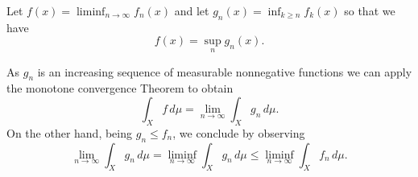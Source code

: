 \documentclass[12pt]{article}
\begin{document}
Let $f(x)=\liminf_{n\to\infty} f_n(x)$ and let $g_n(x)=\inf_{k\ge n} f_k(x)$
so that we have
\[
  f(x) = \sup_n g_n(x).
\]

As $g_n$ is an increasing sequence of measurable nonnegative functions we can apply the monotone convergence Theorem to obtain
\[
  \int_X f\, d\mu = \lim_{n\to\infty} \int_X g_n\, d\mu.
\]
On the other hand, being $g_n\le f_n$, we conclude by observing
\[
  \lim_{n\to\infty} \int_X g_n\, d\mu 
= \liminf_{n\to\infty}\int_X g_n\, d\mu 
\le \liminf_{n\to\infty}\int_X f_n\, d\mu.
\]
\end{document}
